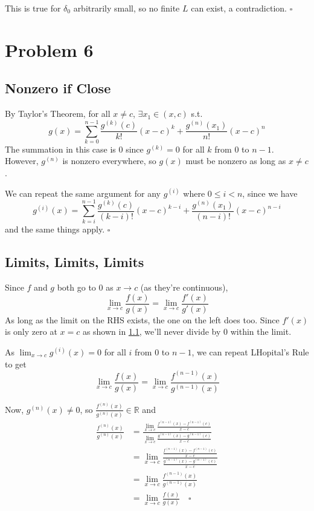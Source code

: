 \documentclass[12pt]{article}
\newcommand{\R}{\mathbb{R}}
\begin{document}
This is true for $\delta_0$ arbitrarily small, so no finite $L$ can exist, a contradiction. $\square$

\pagebreak

\section{Problem 6}

\subsection{Nonzero if Close}\label{sec:p6p1}

By Taylor's Theorem, for all $x \ne c$, $\exists x_1 \in (x, c)$ s.t.
\[g(x)=\sum_{k=0}^{n-1} \frac{g^{(k)}(c)}{k!}(x-c)^k + \frac{g^{(n)}(x_1)}{n!}(x-c)^n\]
The summation in this case is $0$ since $g^{(k)}=0$ for all $k$ from $0$ to $n-1$.
However, $g^{(n)}$ is nonzero everywhere, so $g(x)$ must be nonzero as long as $x \ne c$.

We can repeat the same argument for any $g^{(i)}$ where $0 \le i < n$, since we have
\[g^{(i)}(x)=\sum_{k=i}^{n-1} \frac{g^{(k)}(c)}{(k-i)!}(x-c)^{k-i} + \frac{g^{(n)}(x_1)}{(n-i)!}(x-c)^{n-i}\]
and the same things apply. $\square$

\subsection{Limits, Limits, Limits}

Since $f$ and $g$ both go to $0$ as $x \to c$ (as they're continuous),
\[\lim_{x \to c} \frac{f(x)}{g(x)}=\lim_{x \to c} \frac{f'(x)}{g'(x)}\]
As long as the limit on the RHS exists, the one on the left does too.
Since $f'(x)$ is only zero at $x=c$ as shown in \ref{sec:p6p1},
we'll never divide by $0$ within the limit.

As $\lim_{x \to c} g^{(i)}(x)=0$ for all $i$ from $0$ to $n-1$,
we can repeat LHopital's Rule to get
\[\lim_{x \to c} \frac{f(x)}{g(x)}
  =\lim_{x \to c} \frac{f^{(n-1)}(x)}{g^{(n-1)}(x)}\]

Now, $g^{(n)}(x) \ne 0$, so $\frac{f^{(n)}(x)}{g^{(n)}(x)} \in \R$ and
\begin{align*}
  \frac{f^{(n)}(x)}{g^{(n)}(x)}
  &= \frac{\lim_{x \to c} \frac{f^{(n-1)}(x)-f^{(n-1)}(c)}{x-c}}{\lim_{x \to c} \frac{g^{(n-1)}(x)-g^{(n-1)}(c)}{x-c}} \\
  &= \lim_{x \to c} \frac{\frac{f^{(n-1)}(x)-f^{(n-1)}(c)}{x-c}}{\frac{g^{(n-1)}(x)-g^{(n-1)}(c)}{x-c}} \\
  &= \lim_{x \to c} \frac{f^{(n-1)}(x)}{g^{(n-1)}(x)} \\
  &= \lim_{x \to c} \frac{f(x)}{g(x)}\quad\square
\end{align*}
\end{document}
